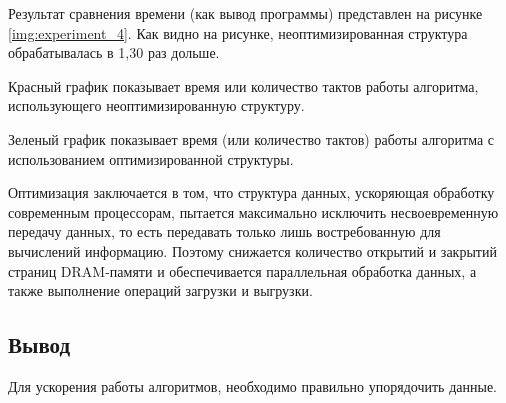 \begin{figure}[H]
\end{figure}

Результат сравнения времени (как вывод программы) представлен на рисунке \ref{img:experiment_4}. Как видно на рисунке, неоптимизированная структура обрабатывалась в 1,30 раз дольше.

Красный график показывает время или количество тактов работы алгоритма, использующего неоптимизированную структуру.

Зеленый график показывает время (или количество тактов) работы алгоритма с использованием оптимизированной структуры.

Оптимизация заключается в том, что структура данных, ускоряющая обработку современным процессорам, пытается максимально исключить несвоевременную передачу данных, то есть передавать только лишь востребованную для вычислений информацию. Поэтому снижается количество открытий и закрытий страниц DRAM-памяти и обеспечивается параллельная обработка данных, а также выполнение операций загрузки и выгрузки.


\subsection*{Вывод}
Для ускорения работы алгоритмов, необходимо правильно упорядочить данные.